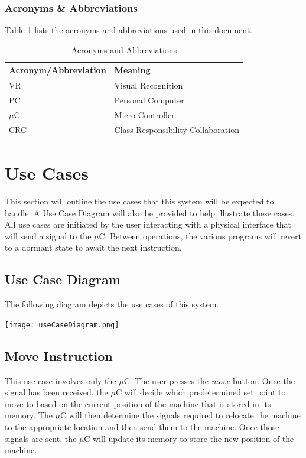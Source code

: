 \documentclass[titlepage]{article}
\begin{document}
\subsubsection{Acronyms \& Abbreviations}
Table \ref{tab:Acronyms} lists the acronyms and abbreviations used in this document.
\begin{table}[h!]
\centering
\caption{Acronyms and Abbreviations}
\begin{tabular}{| p{6cm} | p{6cm} |}\hline
	\textbf{Acronym/Abbreviation}	&\textbf{Meaning}\\\hline
	VR								&Visual Recognition\\\hline
	PC								&Personal Computer\\\hline
	$\mu$C							&Micro-Controller\\\hline
	CRC								&Class Responsibility Collaboration\\\hline
\end{tabular}
\label{tab:Acronyms}
\end{table}
\newpage



\section{Use Cases}
This section will outline the use cases that this system will be expected to handle. A Use Case Diagram will also be provided to help illustrate these cases. All use cases are initiated by the user interacting with a physical interface that will send a signal to the $\mu$C. Between operations, the various programs will revert to a dormant state to await the next instruction.
\subsection{Use Case Diagram}
The following diagram depicts the use cases of this system.\\
\begin{center}
	\texttt{[image: useCaseDiagram.png]}
\label{fig:use case diagram}
\end{center}
\subsection{Move Instruction}
This use case involves only the $\mu$C. The user presses the \textit{move} button. Once the signal has been received, the $\mu$C will decide which predetermined set point to move to based on the current position of the machine that is stored in its memory. The $\mu$C will then determine the signals required to relocate the machine to the appropriate location and then send them to the machine. Once those signals are sent, the $\mu$C will update its memory to store the new position of the machine.
\end{document}
